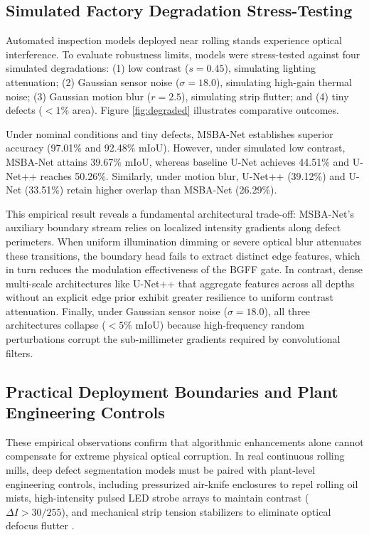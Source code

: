 \documentclass{ieeeaccess}
\begin{document}
\subsection{Simulated Factory Degradation Stress-Testing}
Automated inspection models deployed near rolling stands experience optical interference. To evaluate robustness limits, models were stress-tested against four simulated degradations: (1) low contrast ($s = 0.45$), simulating lighting attenuation; (2) Gaussian sensor noise ($\sigma = 18.0$), simulating high-gain thermal noise; (3) Gaussian motion blur ($r = 2.5$), simulating strip flutter; and (4) tiny defects ($<1\%$ area). Figure \ref{fig:degraded} illustrates comparative outcomes.

Under nominal conditions and tiny defects, MSBA-Net establishes superior accuracy (97.01\% and 92.48\% mIoU). However, under simulated low contrast, MSBA-Net attains 39.67\% mIoU, whereas baseline U-Net achieves 44.51\% and U-Net++ reaches 50.26\%. Similarly, under motion blur, U-Net++ (39.12\%) and U-Net (33.51\%) retain higher overlap than MSBA-Net (26.29\%).

This empirical result reveals a fundamental architectural trade-off: MSBA-Net's auxiliary boundary stream relies on localized intensity gradients along defect perimeters. When uniform illumination dimming or severe optical blur attenuates these transitions, the boundary head fails to extract distinct edge features, which in turn reduces the modulation effectiveness of the BGFF gate. In contrast, dense multi-scale architectures like U-Net++ that aggregate features across all depths without an explicit edge prior exhibit greater resilience to uniform contrast attenuation. Finally, under Gaussian sensor noise ($\sigma = 18.0$), all three architectures collapse ($<5\%$ mIoU) because high-frequency random perturbations corrupt the sub-millimeter gradients required by convolutional filters.

\subsection{Practical Deployment Boundaries and Plant Engineering Controls}
These empirical observations confirm that algorithmic enhancements alone cannot compensate for extreme physical optical corruption. In real continuous rolling mills, deep defect segmentation models must be paired with plant-level engineering controls, including pressurized air-knife enclosures to repel rolling oil mists, high-intensity pulsed LED strobe arrays to maintain contrast ($\Delta I > 30/255$), and mechanical strip tension stabilizers to eliminate optical defocus flutter \cite{satyanarayanan2017edge}.
\end{document}
